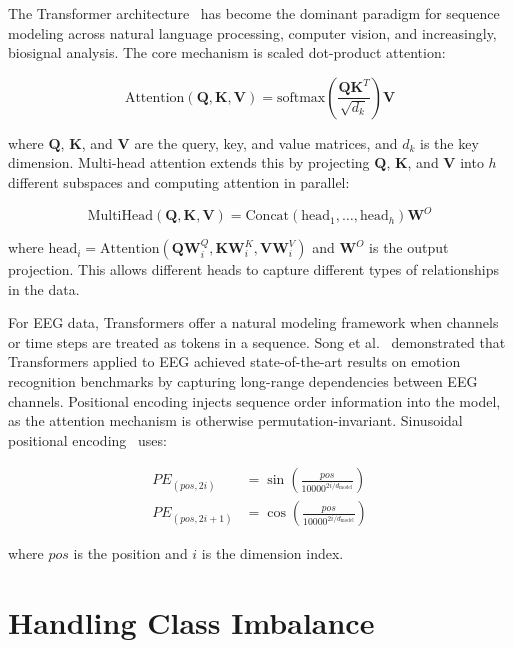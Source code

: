 \documentclass[12pt,letterpaper]{report}
\begin{document}
The Transformer architecture~\cite{vaswani2017} has become the dominant paradigm for sequence modeling across natural language processing, computer vision, and increasingly, biosignal analysis. The core mechanism is scaled dot-product attention:

\begin{equation}
\label{eq:attention}
\text{Attention}(\mathbf{Q}, \mathbf{K}, \mathbf{V}) = \text{softmax}\left(\frac{\mathbf{Q}\mathbf{K}^T}{\sqrt{d_k}}\right)\mathbf{V}
\end{equation}

\noindent where $\mathbf{Q}$, $\mathbf{K}$, and $\mathbf{V}$ are the query, key, and value matrices, and $d_k$ is the key dimension. Multi-head attention extends this by projecting $\mathbf{Q}$, $\mathbf{K}$, and $\mathbf{V}$ into $h$ different subspaces and computing attention in parallel:

\begin{equation}
\label{eq:multihead}
\text{MultiHead}(\mathbf{Q}, \mathbf{K}, \mathbf{V}) = \text{Concat}(\text{head}_1, \ldots, \text{head}_h)\mathbf{W}^O
\end{equation}

\noindent where $\text{head}_i = \text{Attention}(\mathbf{Q}\mathbf{W}_i^Q, \mathbf{K}\mathbf{W}_i^K, \mathbf{V}\mathbf{W}_i^V)$ and $\mathbf{W}^O$ is the output projection. This allows different heads to capture different types of relationships in the data.

For EEG data, Transformers offer a natural modeling framework when channels or time steps are treated as tokens in a sequence. Song et al.~\cite{song2022} demonstrated that Transformers applied to EEG achieved state-of-the-art results on emotion recognition benchmarks by capturing long-range dependencies between EEG channels. Positional encoding injects sequence order information into the model, as the attention mechanism is otherwise permutation-invariant. Sinusoidal positional encoding~\cite{vaswani2017} uses:

\begin{align}
\label{eq:posenc_sin}
PE_{(pos, 2i)} &= \sin\left(\frac{pos}{10000^{2i/d_{\text{model}}}}\right) \\
\label{eq:posenc_cos}
PE_{(pos, 2i+1)} &= \cos\left(\frac{pos}{10000^{2i/d_{\text{model}}}}\right)
\end{align}

\noindent where $pos$ is the position and $i$ is the dimension index.

\section{Handling Class Imbalance}
\label{sec:imbalance}
\end{document}
